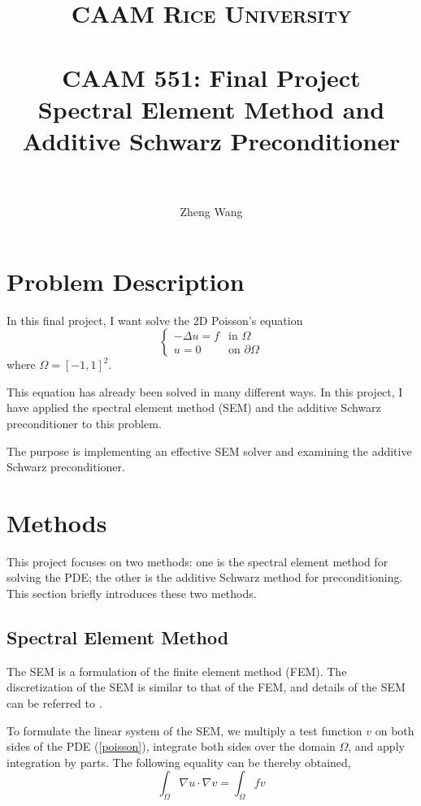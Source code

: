\documentclass[paper=a4, fontsize=11pt]{scrartcl} %
\title{ 
\normalfont \normalsize 
\textsc{CAAM Rice University} \\ [25pt] %
\horrule{0.5pt} \\[0.4cm] %
\huge {CAAM 551: Final Project \\ 
{\Large Spectral Element Method and Additive
  Schwarz Preconditioner}}  \\ %
\horrule{2pt} \\[0.5cm] %
}
\author{Zheng Wang} %
\date{}
\begin{document}
\maketitle %

\section{Problem Description}
In this final project, I want solve the 2D Poisson's equation
\begin{equation}
\left\{
\begin{array}{ll}
-\Delta u = f & \textrm{in } \Omega \\
u = 0 & \textrm{on } \partial \Omega
\end{array}
\right.
\label{poisson}
\end{equation}
where $\Omega = [-1,1]^2$.

This equation has already been solved in many different ways. In this
project, I have applied the spectral element method (SEM) and the
additive Schwarz preconditioner to this problem. 

The purpose is implementing an effective SEM solver and examining the
additive Schwarz preconditioner.

\section{Methods}

This project focuses on two methods: one is the spectral element
method for solving the PDE; the other is the additive Schwarz method
for preconditioning. This section briefly introduces these two methods.

\subsection{Spectral Element Method}

The SEM is a formulation of the finite element method (FEM). The
discretization of the SEM is similar to that of the FEM, and details
of the SEM can be referred to \cite{Dev02}.

To formulate the linear system of the SEM, we multiply a test function
$v$ on both sides of the PDE
(\ref{poisson}), integrate both sides over the domain $\Omega$, and
apply integration by parts. The following equality can be thereby obtained,
\begin{equation}
\int_{\Omega}\nabla u \cdot \nabla v = \int_{\Omega}fv
\end{equation}
\end{document}
